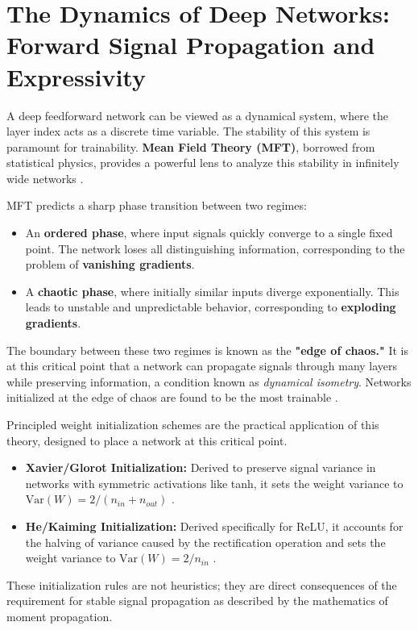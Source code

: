 \section{The Dynamics of Deep Networks: Forward Signal Propagation and Expressivity}
\label{sec:forward_dynamics}

A deep feedforward network can be viewed as a dynamical system, where the layer index acts as a discrete time variable. The stability of this system is paramount for trainability. \textbf{Mean Field Theory (MFT)}, borrowed from statistical physics, provides a powerful lens to analyze this stability in infinitely wide networks \cite{Schoenholz2017DeepInfoProp}.

MFT predicts a sharp phase transition between two regimes:
\begin{itemize}
    \item An \textbf{ordered phase}, where input signals quickly converge to a single fixed point. The network loses all distinguishing information, corresponding to the problem of \textbf{vanishing gradients}.
    \item A \textbf{chaotic phase}, where initially similar inputs diverge exponentially. This leads to unstable and unpredictable behavior, corresponding to \textbf{exploding gradients}.
\end{itemize}
The boundary between these two regimes is known as the \textbf{"edge of chaos."} It is at this critical point that a network can propagate signals through many layers while preserving information, a condition known as \textit{dynamical isometry}. Networks initialized at the edge of chaos are found to be the most trainable \cite{Poole2016ExponentialExpressivity}.

Principled weight initialization schemes are the practical application of this theory, designed to place a network at this critical point.
\begin{itemize}
    \item \textbf{Xavier/Glorot Initialization:} Derived to preserve signal variance in networks with symmetric activations like tanh, it sets the weight variance to $\text{Var}(W) = 2/(n_{in} + n_{out})$ \cite{GlorotBengio2010Difficulty}.
    \item \textbf{He/Kaiming Initialization:} Derived specifically for ReLU, it accounts for the halving of variance caused by the rectification operation and sets the weight variance to $\text{Var}(W) = 2/n_{in}$ \cite{He2015Delving}.
\end{itemize}
These initialization rules are not heuristics; they are direct consequences of the requirement for stable signal propagation as described by the mathematics of moment propagation.

